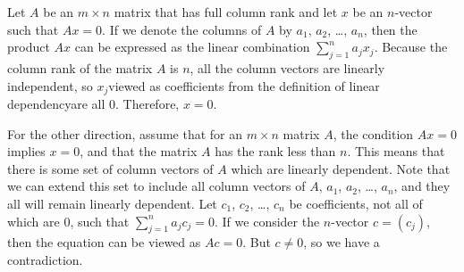 Let $A$ be an $m\times n$ matrix that has full column rank and let $x$ be an $n$-vector such that $Ax=0$.
If we denote the columns of $A$ by $a_1$, $a_2$, \dots, $a_n$, then the product $Ax$ can be expressed as the linear combination $\sum_{j=1}^na_jx_j$.
Because the column rank of the matrix $A$ is $n$, all the column vectors are linearly independent, so $x_j$\dash viewed as coefficients from the definition of linear dependency\dash are all 0.
Therefore, $x=0$.

For the other direction, assume that for an $m\times n$ matrix $A$, the condition $Ax=0$ implies $x=0$, and that the matrix $A$ has the rank less than $n$.
This means that there is some set of column vectors of $A$ which are linearly dependent.
Note that we can extend this set to include all column vectors of $A$, $a_1$, $a_2$, \dots, $a_n$, and they all will remain linearly dependent.
Let $c_1$, $c_2$, \dots, $c_n$ be coefficients, not all of which are 0, such that $\sum_{j=1}^na_jc_j=0$.
If we consider the $n$-vector $c=(c_j)$, then the equation can be viewed as $Ac=0$.
But $c\ne0$, so we have a contradiction.
